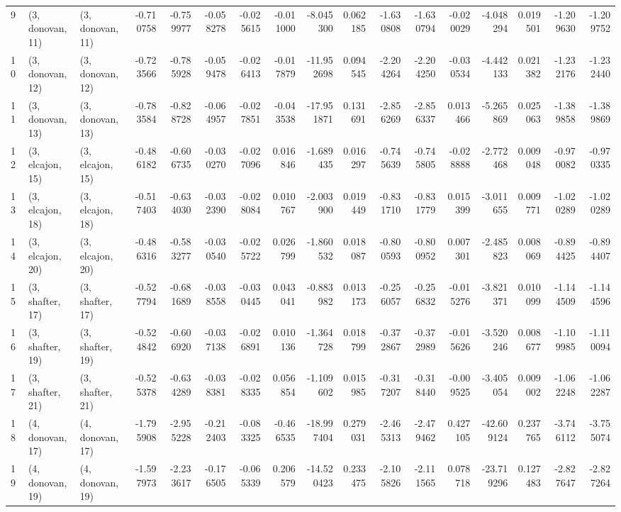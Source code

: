 \begin{tabular}{lllrrrrrrrrrrrrrr}
9  &  (3, donovan, 11) &  (3, donovan, 11) & -0.710758 & -0.759977 &  -0.058278 & -0.025615 & -0.011000 &  -8.045300 &  0.062185 &  -1.630808 & -1.630794 & -0.020029 &  -4.048294 &  0.019501 & -1.209630 & -1.209752 \\
10 &  (3, donovan, 12) &  (3, donovan, 12) & -0.723566 & -0.785928 &  -0.059478 & -0.026413 & -0.017879 & -11.952698 &  0.094545 &  -2.204264 & -2.204250 & -0.030534 &  -4.442133 &  0.021382 & -1.232176 & -1.232440 \\
11 &  (3, donovan, 13) &  (3, donovan, 13) & -0.783584 & -0.828728 &  -0.064957 & -0.027851 & -0.043538 & -17.951871 &  0.131691 &  -2.856269 & -2.856337 &  0.013466 &  -5.265869 &  0.025063 & -1.389858 & -1.389869 \\
12 &  (3, elcajon, 15) &  (3, elcajon, 15) & -0.486182 & -0.606735 &  -0.030270 & -0.027096 &  0.016846 &  -1.689435 &  0.016297 &  -0.745639 & -0.745805 & -0.028888 &  -2.772468 &  0.009048 & -0.970082 & -0.970335 \\
13 &  (3, elcajon, 18) &  (3, elcajon, 18) & -0.517403 & -0.634030 &  -0.032390 & -0.028084 &  0.010767 &  -2.003900 &  0.019449 &  -0.831710 & -0.831779 &  0.015399 &  -3.011655 &  0.009771 & -1.020289 & -1.020289 \\
14 &  (3, elcajon, 20) &  (3, elcajon, 20) & -0.486316 & -0.583277 &  -0.030540 & -0.025722 &  0.026799 &  -1.860532 &  0.018087 &  -0.800593 & -0.800952 &  0.007301 &  -2.485823 &  0.008069 & -0.894425 & -0.894407 \\
15 &  (3, shafter, 17) &  (3, shafter, 17) & -0.527794 & -0.681689 &  -0.038558 & -0.030445 &  0.043041 &  -0.883982 &  0.013173 &  -0.256057 & -0.256832 & -0.015276 &  -3.821371 &  0.010099 & -1.144509 & -1.144596 \\
16 &  (3, shafter, 19) &  (3, shafter, 19) & -0.524842 & -0.606920 &  -0.037138 & -0.026891 &  0.010136 &  -1.364728 &  0.018799 &  -0.372867 & -0.372989 & -0.015626 &  -3.520246 &  0.008677 & -1.109985 & -1.110094 \\
17 &  (3, shafter, 21) &  (3, shafter, 21) & -0.525378 & -0.634289 &  -0.038381 & -0.028335 &  0.056854 &  -1.109602 &  0.015985 &  -0.317207 & -0.318440 & -0.009525 &  -3.405054 &  0.009002 & -1.062248 & -1.062287 \\
18 &  (4, donovan, 17) &  (4, donovan, 17) & -1.795908 & -2.955228 &  -0.212403 & -0.083325 & -0.466535 & -18.997404 &  0.279031 &  -2.465313 & -2.479462 &  0.427105 & -42.609124 &  0.237765 & -3.746112 & -3.755074 \\
19 &  (4, donovan, 19) &  (4, donovan, 19) & -1.597973 & -2.233617 &  -0.176505 & -0.065339 &  0.206579 & -14.520423 &  0.233475 &  -2.105826 & -2.111565 &  0.078718 & -23.719296 &  0.127483 & -2.827647 & -2.827264 \\

\end{tabular}
